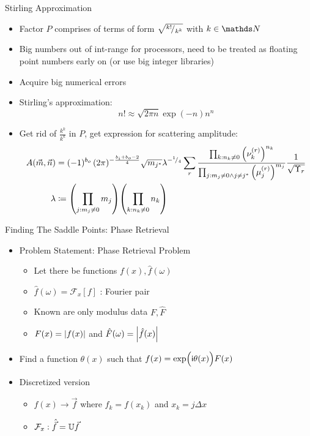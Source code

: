 
\begin{frame}{Stirling Approximation}
%
\begin{itemize}
\item Factor $P$ comprises of terms of form $\sqrt{{}^ {k!} \!/_ {k^k}}$ with $k \in \setNaturals$
\item Big numbers out of int-range for processors, need to be treated as floating point numbers early on (or use big integer libraries)
\item Acquire big numerical errors
\item Stirling's approximation:
	\begin{equation*}
		n! \approx \sqrt{2\pi n} \exp(-n) n^n
	\end{equation*}
\item Get rid of $\frac{k^k}{k^k}$ in $P$, get expression for scattering amplitude:
	\begin{align*}
		A(\vec{m}, \vec{n})
	&=
		(-1)^{b_o} \,	
		(2\pi)^{-\frac{b_i + b_o - 2}{4}}
		\sqrt{m_{j^*}}
		\lambda^{-{}^ {1} \!/_ {4}}
		\sum_{r}	
			\frac
				{\prod_{k : n_k \neq 0}                  \qty(\nu_k^{(r)})^{n_k}}
				{\prod_{j : m_j \neq 0 \land j \neq j^*} \qty(\mu_j^{(r)})^{m_j}}
			\frac{1}{\sqrt{\Upsilon_r}}
		\\
			\lambda
		&\coloneqq
			\qty( \prod_{j : m_j \neq 0} m_j )
			\qty( \prod_{k : n_k \neq 0} n_k )
	\end{align*}
\end{itemize}
%
\end{frame}


\begin{frame}{Finding The Saddle Points: Phase Retrieval}
%
\begin{itemize}
\item Problem Statement: Phase Retrieval Problem
	\begin{itemize}
	\item Let there be functions $f(x), \hat{f}(\omega)$
	\item $\hat{f}(\omega) = \mathcal{F}_x[f]$ : Fourier pair
	\item Known are only modulus data $F, \hat{F}$
	\item $F(x) = \abs{f(x)}$ and $\hat{F}(\omega) = \abs{\hat{f}(x)}$
	\end{itemize}
\item[\Thus] Find a function $\theta(x)$ such that 	$f(x) = \exp(\Big. \mathsf{i} \theta(x)) F(x)$
\item Discretized version
	\begin{itemize}
	\item $f(x) \to \vec{f}$ where $f_k = f(x_k)$ and $x_k = j \Delta x$
	\item $\mathcal{F}_x : \hat{\vec{f}} = \mathbb{U} \vec{f}$
	\end{itemize}
\end{itemize}
%
\end{frame}

